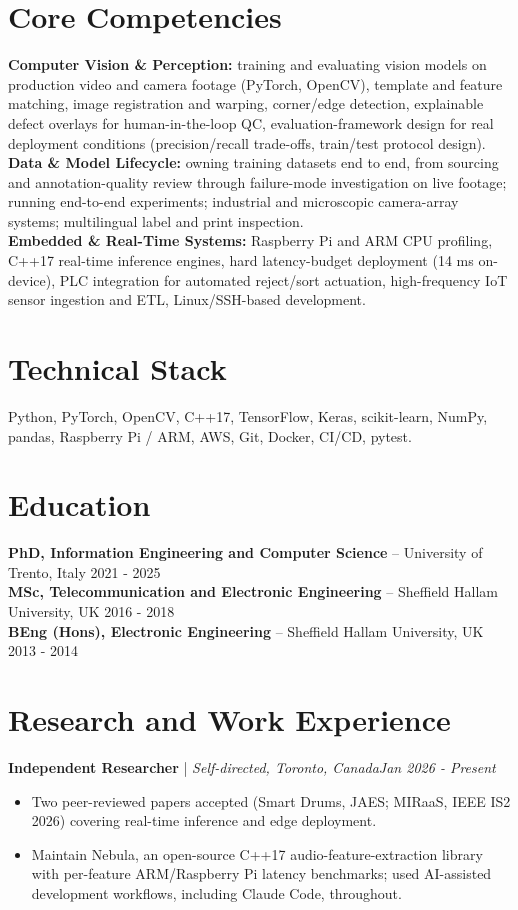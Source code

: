 \documentclass[11pt]{article}
\newenvironment{cvrole}[5]{%
  \par\noindent\textbf{\large #1} | \textit{\small #2, #3}\hfill \textit{\small #4 - #5}\par
  \begin{itemize}[leftmargin=2em, itemsep=-0.3em, topsep=-0.5em]%
}{%
  \end{itemize}\par\noindent\mbox{}\par\vspace{0.1em}%
}
\begin{document}
\section*{Core Competencies}
\textbf{Computer Vision \& Perception:} training and evaluating vision models on production video and camera footage (PyTorch, OpenCV), template and feature matching, image registration and warping, corner/edge detection, explainable defect overlays for human-in-the-loop QC, evaluation-framework design for real deployment conditions (precision/recall trade-offs, train/test protocol design). \\[2pt]
\textbf{Data \& Model Lifecycle:} owning training datasets end to end, from sourcing and annotation-quality review through failure-mode investigation on live footage; running end-to-end experiments; industrial and microscopic camera-array systems; multilingual label and print inspection. \\[2pt]
\textbf{Embedded \& Real-Time Systems:} Raspberry Pi and ARM CPU profiling, C++17 real-time inference engines, hard latency-budget deployment (14 ms on-device), PLC integration for automated reject/sort actuation, high-frequency IoT sensor ingestion and ETL, Linux/SSH-based development.

\section*{Technical Stack}
Python, PyTorch, OpenCV, C++17, TensorFlow, Keras, scikit-learn, NumPy, pandas, Raspberry Pi / ARM, AWS, Git, Docker, CI/CD, pytest.

\section*{Education}
\noindent\textbf{PhD, Information Engineering and Computer Science} -- University of Trento, Italy \hfill 2021 - 2025 \\
\noindent\textbf{MSc, Telecommunication and Electronic Engineering} -- Sheffield Hallam University, UK \hfill 2016 - 2018 \\
\noindent\textbf{BEng (Hons), Electronic Engineering} -- Sheffield Hallam University, UK \hfill 2013 - 2014

\section*{Research and Work Experience}

\begin{cvrole}{Independent Researcher}{Self-directed}{Toronto, Canada}{Jan 2026}{Present}
\item Two peer-reviewed papers accepted (Smart Drums, JAES; MIRaaS, IEEE IS2 2026) covering real-time inference and edge deployment.
\item Maintain Nebula, an open-source C++17 audio-feature-extraction library with per-feature ARM/Raspberry Pi latency benchmarks; used AI-assisted development workflows, including Claude Code, throughout.
\end{cvrole}
\end{document}
